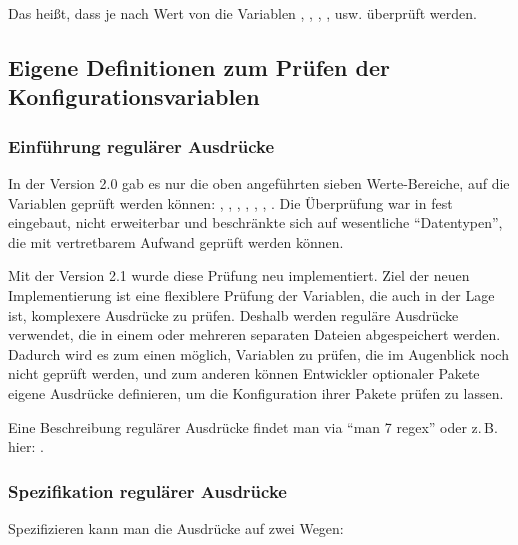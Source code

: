       Das heißt, dass je nach Wert von  die Variablen ,
      , , , usw. überprüft werden.

\subsection{Eigene Definitionen zum Prüfen der Konfigurationsvariablen}

\subsubsection{Einführung regulärer Ausdrücke}

  In der Version 2.0 gab es nur die oben angeführten sieben Werte-Bereiche,
  auf die Variablen geprüft werden können: , , ,
  , , , . Die Überprüfung war in 
  fest eingebaut, nicht erweiterbar und beschränkte sich auf
  wesentliche "`Datentypen"', die mit vertretbarem Aufwand geprüft
  werden können.

  Mit der Version 2.1 wurde diese Prüfung neu implementiert.  Ziel der
  neuen Implementierung ist eine flexiblere Prüfung der Variablen, die
  auch in der Lage ist, komplexere Ausdrücke zu prüfen. Deshalb werden
  reguläre Ausdrücke verwendet, die in einem oder mehreren separaten
  Dateien abgespeichert werden.  Dadurch wird es zum einen möglich,
  Variablen zu prüfen, die im Augenblick noch nicht geprüft werden, und
  zum anderen können Entwickler optionaler Pakete eigene Ausdrücke
  definieren, um die Konfiguration ihrer Pakete prüfen zu lassen.

  Eine Beschreibung regulärer Ausdrücke findet man via "`man 7 regex"'
  oder z.\,B. hier: .


\subsubsection{Spezifikation regulärer Ausdrücke}

  Spezifizieren kann man die Ausdrücke auf zwei Wegen:

